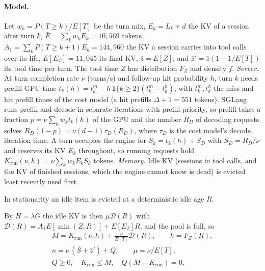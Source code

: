 \paragraph{Model.}\label{sec:fp-model}
Let $w_k=P(T\ge k)/E[T]$ be the turn mix, $E_k=L_k+d$ the KV of a session after turn $k$, $\bar E=\sum_k w_kE_k=10{,}569$ tokens, $A_1=\sum_k P(T\ge k+1)E_k=144{,}960$ the KV a session carries into tool calls over its life, $E[E_T]=11{,}045$ its final KV, $\bar z=E[Z]$, and $\bar z'=\bar z(1-1/E[T])$ its tool time per turn. The tool time $Z$ has distribution $F_Z$ and density $f$. \emph{Server.} At turn completion rate $\nu$ (turns/s) and follow-up hit probability $h$, turn $k$ needs prefill GPU time $t_k(h)=t^m_k-h\,\mathbf 1\{k\ge2\}(t^m_k-t^h_k)$, with $t^m_k,t^h_k$ the miss and hit prefill times of the cost model (a hit prefills $\Delta+1=551$ tokens). SGLang runs prefill and decode in separate iterations with prefill priority, so prefill takes a fraction $p=\nu\sum_kw_kt_k(h)$ of the GPU and the number $R_D$ of decoding requests solves $R_D(1-p)=\nu(d-1)\tau_D(R_D)$, where $\tau_D$ is the cost model's decode iteration time. A turn occupies the engine for $S_k=t_k(h)+S_D$ with $S_D=R_D/\nu$ and reserves its KV $E_k$ throughout, so running requests hold $K_{\mathrm{run}}(\nu,h)=\nu\sum_kw_kE_kS_k$ tokens. \emph{Memory.} Idle KV (sessions in tool calls, and the KV of finished sessions, which the engine cannot know is dead) is evicted least recently used first.
\begin{assumption}
In stationarity an idle item is evicted at a deterministic idle age $R$.
\end{assumption}
\noindent By $H=\lambda G$ the idle KV is then $\mu\mathcal D(R)$ with $\mathcal D(R)=A_1E[\min(Z,R)]+E[E_T]R$, and the pool is full, so
\begin{equation}\label{eq:balance}
\begin{gathered}
M=K_{\mathrm{run}}(\nu,h)+\frac{\nu}{E[T]}\mathcal D(R),\qquad h=F_Z(R),\\
n=\nu\,(\bar S+\bar z')+Q,\qquad \mu=\nu/E[T],\\
Q\ge0,\quad K_{\mathrm{run}}\le M,\quad Q(M-K_{\mathrm{run}})=0,
\end{gathered}
\end{equation}
